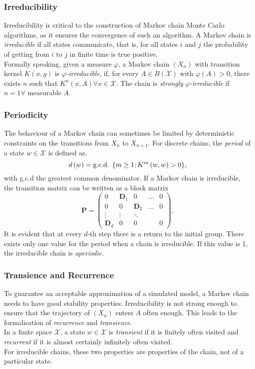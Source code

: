 \documentclass[12pt]{book}
\begin{document}
\subsubsection{Irreducibility} 
Irreducibility is critical to the construction of Markov chain Monte Carlo algorithms, as it ensures the convergence of such an algorithm. A Markov chain is \textit{irreducible} if all states communicate, that is, for all states $i$ and $j$ the probability of getting from $i$ to $j$ in finite time is true positive. \\
Formally speaking, given a measure $\varphi$, a Markov chain $\left(X_n\right)$ with transition kernel $K\left(x,y\right)$ is $\varphi$-\textit{irreducible}, if, for every $A\in B\left(\mathcal{X}\right)$ with $\varphi\left(A\right)>0$, there exists $n$ such that $K^n\left(x,A\right) \forall x\in\mathcal{X}$. The chain is \textit{strongly} $\varphi$-\textit{irreducible} if $n=1\forall$ measurable $A$.
\subsubsection{Periodicity} 
The behaviour of a Markov chain can sometimes be limited by deterministic constraints on the transitions from $X_n$ to $X_{n+1}$. For discrete chains, the \textit{period} of a state $w\in\mathcal{X}$ is defined as. 
\begin{equation*}
    d\left(w\right)=\hbox{g.c.d. } \lbrace m\geq 1;K^m\left(w,w\right)>0\rbrace,
\end{equation*}
with g.c.d the greatest common denominator. If a Markov chain is irreducible, the transition matrix can be written as a block matrix
\begin{equation}
    \pmb{P}=\begin{pmatrix}
    0 & \pmb{D}_1 & 0 & \dots & 0\\
    0 & 0 & \pmb{D}_2 & \dots & 0 \\
    \vdots & \vdots & \ddots  \\
    \pmb{D}_d & 0 & 0 & & 0
    \end{pmatrix},
\end{equation}
It is evident that at every $d$-th step there is a return to the initial group. There exists only one value for the period when a chain is irreducible. If this value is 1, the irreducible chain is \textit{aperiodic}.
 \subsubsection{Transience and Recurrence} 
To guarantee an acceptable approximation of a simulated model, a Markov chain needs to have good stability properties. Irreducibility is not strong enough to ensure that the trajectory of $\left(X_n\right)$ enters $A$ often enough. This leads to the formalisation of \textit{recurrence} and \textit{transience}.  \\
In a finite space $\mathcal{X}$, a state $w\in\mathcal{X}$ is \textit{transient} if it is finitely often visited and \textit{recurrent} if it is almost certainly infinitely often visited. \\
For irreducible chains, these two properties are properties of the chain, not of a particular state. 
\end{document}
